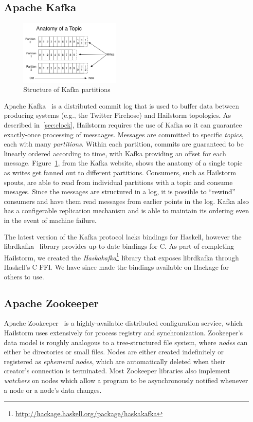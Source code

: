 \documentclass[10pt,nocopyrightspace]{sigplanconf}
\begin{document}
\subsection{Apache Kafka}
\begin{figure}
  \includegraphics[width=0.45\textwidth]{images/kafka_log.png}
  \caption{Structure of Kafka partitions}
  \label{fig:kafka}
\end{figure}
Apache Kafka~\cite{kafka} is a distributed commit log that is used to buffer data between
producing systems (e.g., the Twitter Firehose) and Hailstorm topologies. As
described in~\ref{sec:clock}, Hailstorm requires the use of Kafka so it can
guarantee exactly-once processing of messaages. Messages are committed to
specific \textit{topics}, each with many \textit{partitions}. Within each
partition, commits are guaranteed to be linearly ordered according to time, with
Kafka providing an offset for each message. Figure~\ref{fig:kafka}, from the
Kafka website, shows the anatomy of a single topic as writes get fanned out to
different partitions. Consumers, such as Hailstorm spouts, are able to read from
individual partitions with a topic and consume mesages. Since the messages are
structured in a log, it is possible to ``rewind'' consumers and have them read
messages from earlier points in the log. Kafka also has a configerable replication 
mechanism and is able to maintain its ordering even in the event of machine failure.

The latest version of the Kafka protocol lacks bindings for Haskell, however the
librdkafka~\cite{rdkafka} library provides up-to-date bindings for C. As part
of completing Hailstorm, we created the \textit{Haskakafka}\footnote{
\url{http://hackage.haskell.org/package/haskakafka}} library that exposes
librdkafka through Haskell's C FFI. We have since made the bindings available on
Hackage for others to use.


\subsection{Apache Zookeeper}
\label{sec:zookeeper}
Apache Zookeeper~\cite{zookeeper} is a highly-available distributed 
configuration service, which Hailstorm uses extensively for process 
registry and synchronization. Zookeeper's data model is roughly analogous 
to a tree-structured file system, where \textit{nodes} can either be 
directories or small files. Nodes are either created indefinitely 
or registered as \textit{ephemeral nodes}, which are automatically 
deleted when their creator's connection is terminated. Most Zookeeper
libraries also implement \textit{watchers} on nodes which allow a program to be
asynchronously notified whenever a node or a node's data changes. 
\end{document}
